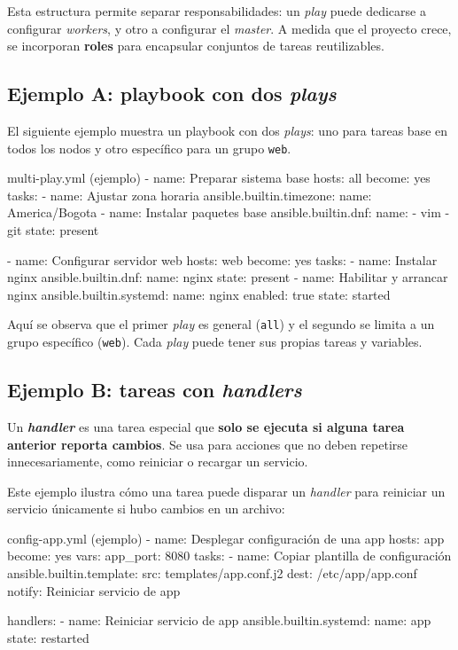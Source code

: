 Esta estructura permite separar responsabilidades: un \textit{play} puede dedicarse a configurar \textit{workers}, y otro a configurar el \textit{master}. A medida que el proyecto crece, se incorporan \textbf{roles} para encapsular conjuntos de tareas reutilizables.

\subsection{Ejemplo A: playbook con dos \textit{plays}}
\label{subsec:ansible_play_example_two_plays}

El siguiente ejemplo muestra un playbook con dos \textit{plays}: uno para tareas base en todos los nodos y otro específico para un grupo \texttt{web}.

\begin{yamlcode}
multi-play.yml (ejemplo)
- name: Preparar sistema base
  hosts: all
  become: yes
  tasks:
    - name: Ajustar zona horaria
      ansible.builtin.timezone:
        name: America/Bogota
    - name: Instalar paquetes base
      ansible.builtin.dnf:
        name:
          - vim
          - git
        state: present

- name: Configurar servidor web
  hosts: web
  become: yes
  tasks:
    - name: Instalar nginx
      ansible.builtin.dnf:
        name: nginx
        state: present
    - name: Habilitar y arrancar nginx
      ansible.builtin.systemd:
        name: nginx
        enabled: true
        state: started
\end{yamlcode}

Aquí se observa que el primer \textit{play} es general (\texttt{all}) y el segundo se limita a un grupo específico (\texttt{web}). Cada \textit{play} puede tener sus propias tareas y variables.

\subsection{Ejemplo B: tareas con \textit{handlers}}
\label{subsec:ansible_play_example_handlers}

Un \textbf{\textit{handler}} es una tarea especial que \textbf{solo se ejecuta si alguna tarea anterior reporta cambios}. Se usa para acciones que no deben repetirse innecesariamente, como reiniciar o recargar un servicio.


Este ejemplo ilustra cómo una tarea puede disparar un \textit{handler} para reiniciar un servicio únicamente si hubo cambios en un archivo:

\begin{yamlcode}
config-app.yml (ejemplo)
- name: Desplegar configuración de una app
  hosts: app
  become: yes
  vars:
    app_port: 8080
  tasks:
    - name: Copiar plantilla de configuración
      ansible.builtin.template:
        src: templates/app.conf.j2
        dest: /etc/app/app.conf
      notify: Reiniciar servicio de app

  handlers:
    - name: Reiniciar servicio de app
      ansible.builtin.systemd:
        name: app
        state: restarted
\end{yamlcode}

